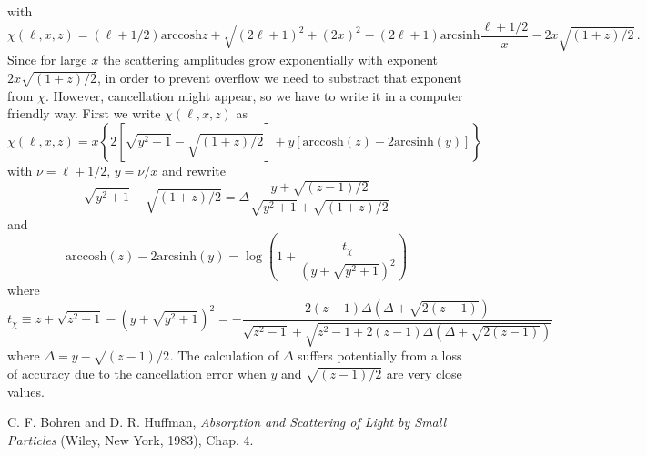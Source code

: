\documentclass[onecolumn%
              ,superscriptaddress%
              ,aps%
              ,pra]{revtex4}
\begin{document}
with
\begin{equation}
\chi(\ell,x,z) = (\ell+1/2)\mathrm{arccosh}z + \sqrt{(2\ell+1)^2 + (2 x)^2} - (2\ell+1) \mathrm{arcsinh} \frac{\ell+1/2}{x} - 2 x \sqrt{(1+z)/2}\,.
\end{equation}
Since for large $x$ the scattering amplitudes grow exponentially with exponent $2 x \sqrt{(1+z)/2}$, in order to prevent overflow we need to substract that exponent from $\chi$. However, cancellation might appear, so we have to write it in a computer friendly way. First we write $\chi(\ell, x, z)$ as
\begin{equation}
\chi(\ell,x,z) = x\left\lbrace2\left[\sqrt{y^2+1} - \sqrt{(1+z)/2}\right] + y\left[\mathrm{arccosh}(z) - 2\mathrm{arcsinh} (y)\right]\right\rbrace
\end{equation}
with $\nu = \ell+1/2$, $y = \nu/x$ and rewrite
\begin{equation}
\sqrt{y^2 + 1} - \sqrt{(1+z)/2} = \Delta \frac{y+\sqrt{(z-1)/2}}{\sqrt{y^2+1} + \sqrt{(1+z)/2}}
\end{equation}
and
\begin{equation}
\mathrm{arccosh}(z) - 2\mathrm{arcsinh} (y) = \log\left(1+ \frac{t_\chi}{(y+\sqrt{y^2+1})^2}\right)
\end{equation}
where
\begin{equation}
t_\chi \equiv z+\sqrt{z^2-1}-(y+\sqrt{y^2+1})^2 = -  \frac{2(z-1)\Delta(\Delta + \sqrt{2(z-1)})}{\sqrt{z^2-1} + \sqrt{z^2-1+2(z-1)\Delta(\Delta + \sqrt{2(z-1)})}}
\end{equation}
where $\Delta = y-\sqrt{(z-1)/2}$. The calculation of $\Delta$ suffers potentially from a loss of accuracy due to the cancellation error when $y$ and $\sqrt{(z-1)/2}$ are very close values.


\begin{thebibliography}{99}
C. F. Bohren and D. R. Huffman,
\textit{Absorption and Scattering of Light by Small Particles}
(Wiley, New York, 1983), Chap. 4.

\end{thebibliography}
\end{document}

